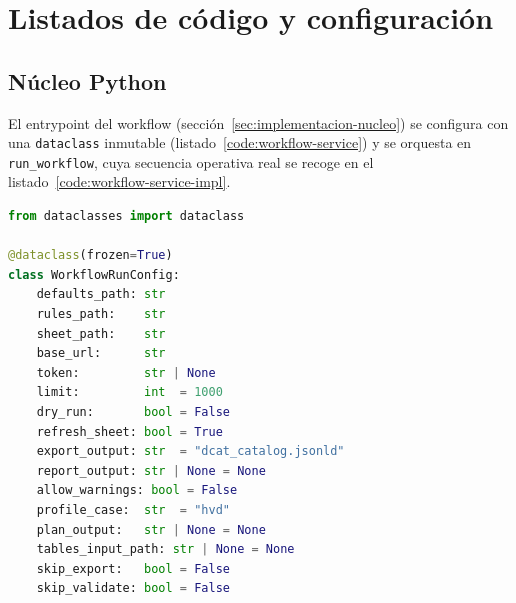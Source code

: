 \section{Listados de código y configuración}

\subsection{Núcleo Python}

El entrypoint del workflow (sección~\ref{sec:implementacion-nucleo}) se configura con una \texttt{dataclass} inmutable (listado~\ref{code:workflow-service}) y se orquesta en \texttt{run\_workflow}, cuya secuencia operativa real se recoge en el listado~\ref{code:workflow-service-impl}.

\begin{lstlisting}[language=Python, caption={Configuración inmutable del workflow canónico en \texttt{workflow\_service.py}.}, label=code:workflow-service, captionpos=b]
from dataclasses import dataclass

@dataclass(frozen=True)
class WorkflowRunConfig:
    defaults_path: str
    rules_path:    str
    sheet_path:    str
    base_url:      str
    token:         str | None
    limit:         int  = 1000
    dry_run:       bool = False
    refresh_sheet: bool = True
    export_output: str  = "dcat_catalog.jsonld"
    report_output: str | None = None
    allow_warnings: bool = False
    profile_case:  str  = "hvd"
    plan_output:   str | None = None
    tables_input_path: str | None = None
    skip_export:   bool = False
    skip_validate: bool = False
\end{lstlisting}

